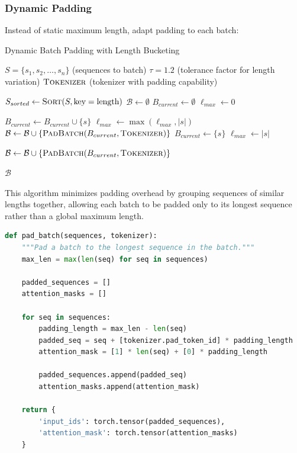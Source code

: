 \subsubsection{Dynamic Padding}
Instead of static maximum length, adapt padding to each batch:

\begin{algorithm}[h]
\caption{Dynamic Batch Padding with Length Bucketing}
\begin{algorithmic}[1]
\Require $S = \{s_1, s_2, \ldots, s_n\}$ (sequences to batch)
\Require $\tau = 1.2$ (tolerance factor for length variation)
\Require $\textsc{Tokenizer}$ (tokenizer with padding capability)

\State $S_{sorted} \gets \textsc{Sort}(S, \text{key}=\text{length})$ 
\State $\mathcal{B} \gets \emptyset$ 
\State $B_{current} \gets \emptyset$ 
\State $\ell_{max} \gets 0$ 

     
        \State $B_{current} \gets B_{current} \cup \{s\}$
        \State $\ell_{max} \gets \max(\ell_{max}, |s|)$
    \Else {}
            \State $\mathcal{B} \gets \mathcal{B} \cup \{\textsc{PadBatch}(B_{current}, \textsc{Tokenizer})\}$
        \EndIf
        \State $B_{current} \gets \{s\}$
        \State $\ell_{max} \gets |s|$
    \EndIf
\EndFor

 
    \State $\mathcal{B} \gets \mathcal{B} \cup \{\textsc{PadBatch}(B_{current}, \textsc{Tokenizer})\}$
\EndIf

\State \Return $\mathcal{B}$
\end{algorithmic}
\end{algorithm}

This algorithm minimizes padding overhead by grouping sequences of similar lengths together, allowing each batch to be padded only to its longest sequence rather than a global maximum length.

\begin{lstlisting}[language=Python, caption={Helper function for batch padding}]
def pad_batch(sequences, tokenizer):
    """Pad a batch to the longest sequence in the batch."""
    max_len = max(len(seq) for seq in sequences)
    
    padded_sequences = []
    attention_masks = []
    
    for seq in sequences:
        padding_length = max_len - len(seq)
        padded_seq = seq + [tokenizer.pad_token_id] * padding_length
        attention_mask = [1] * len(seq) + [0] * padding_length
        
        padded_sequences.append(padded_seq)
        attention_masks.append(attention_mask)
    
    return {
        'input_ids': torch.tensor(padded_sequences),
        'attention_mask': torch.tensor(attention_masks)
    }
\end{lstlisting}

